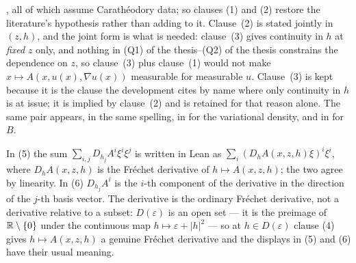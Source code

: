 \begin{definition}
[LU, chapter 4], all of which assume Carath\'eodory data; so clauses (1) and (2)
restore the literature's hypothesis rather than adding to it.  Clause~(2) is
stated jointly in $(z,h)$, and the joint form is what is needed: clause~(3)
gives continuity in $h$ at \emph{fixed} $z$ only, and nothing in
(Q1) of the thesis--(Q2) of the thesis constrains the dependence on $z$, so clause~(3)
plus clause~(1) would not make $x\mapsto A(x,u(x),\nabla u(x))$ measurable for
measurable $u$.  Clause~(3) is kept because it is the clause the development
cites by name where only continuity in $h$ is at issue; it is implied by
clause~(2) and is retained for that reason alone.  The same pair appears, in the
same spelling, in  for the variational density, and
in  for $B$.

In (5) the sum $\sum_{i,j}D_{h_j}A^i\xi^i\xi^j$ is written in Lean as
$\sum_i (D_hA(x,z,h)\xi)^i\xi^i$, where $D_hA(x,z,h)$ is the Fr\'echet
derivative of $h\mapsto A(x,z,h)$; the two agree by linearity.  In (6)
$D_{h_j}A^i$ is the $i$-th component of the derivative in the direction of the
$j$-th basis vector.  The derivative is the ordinary Fr\'echet derivative, not a
derivative relative to a subset: $D(\varepsilon)$ is an open set --- it is the
preimage of $\mathbb{R}\setminus\{0\}$ under the continuous map $h\mapsto\varepsilon+|h|^2$
--- so at $h\in D(\varepsilon)$ clause (4) gives $h\mapsto A(x,z,h)$ a genuine
Fr\'echet derivative and the displays in (5) and (6) have their usual meaning.


\end{definition}
